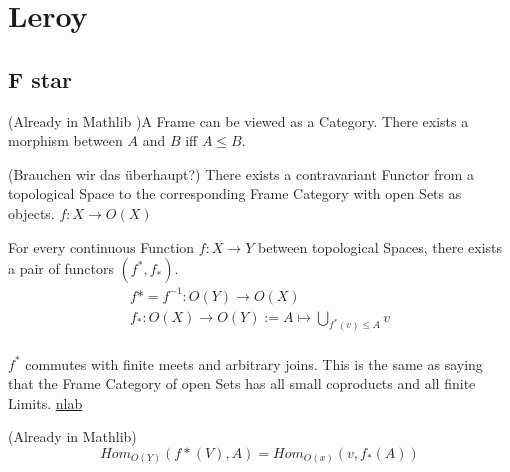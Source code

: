 \chapter{Leroy}


\section{F star}

\begin{definition}[Frame]
    \label{lem:frame}
    (Already in Mathlib )A Frame can be viewed as a Category.
    There exists a morphism between $A$ and $B$ iff $A \le B$.
    \leanok
\end{definition}

\begin{definition}
    \label{def:top_frame_func}
    (Brauchen wir das überhaupt?) There exists a contravariant Functor from a topological Space to the corresponding Frame Category with open Sets as objects. $f: X \rightarrow O(X)$
\end{definition}

\begin{definition}[$f^*$ and $f_*$]
    \label{def:f_star}
    \leanok
    For every continuous Function $f : X \rightarrow Y$ between topological Spaces, there exists a pair of functors $(f^*,f_*)$.
    \begin{gather*}
        f* = f^{-1} : O(Y) \rightarrow O(X)\\
        f_* : O(X) \rightarrow O(Y) := A \mapsto \bigcup_{f^*(v) \le A} v\\
    \end{gather*}
\end{definition}

\begin{lemma}[$f^*$ commutes]
    \label{lem:f_star_comm}

    $f^*$ commutes with finite meets and arbitrary joins. This is the same as saying that the Frame Category of open Sets has all small coproducts and all finite Limits. \href{https://ncatlab.org/nlab/show/frame}{nlab}
\end{lemma}

\begin{lemma}[Homsets]
    \label{lem:f_star_homsets}
    \leanok
    (Already in Mathlib)
    \[Hom_{O(Y)}(f*(V), A) = Hom_{O(x)}(v, f_*(A))\]
\end{lemma}

